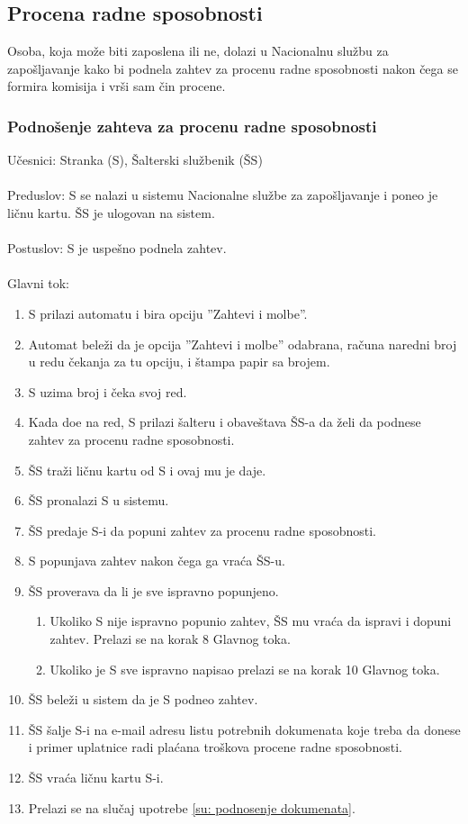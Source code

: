\subsection{Procena radne sposobnosti}

Osoba, koja mo\v ze biti zaposlena ili ne, dolazi u Nacionalnu slu\v zbu za zapo\v sljavanje kako bi podnela zahtev za procenu radne sposobnosti nakon \v cega se formira komisija i vr\v si sam \v cin procene.


\subsubsection{Podno\v senje zahteva za procenu radne sposobnosti}

\noindent U\v cesnici: Stranka (S), \v Salterski slu\v zbenik (\v SS)
\\
\\ Preduslov: S se nalazi u sistemu Nacionalne slu\v zbe za zapo\v sljavanje i poneo je li\v cnu kartu.  \v SS je ulogovan na sistem.
\\
\\ Postuslov: S je uspe\v sno podnela zahtev.
\\
\\ Glavni tok:
\begin{enumerate}
	\item S prilazi automatu i bira opciju ''Zahtevi i molbe''.
	\item Automat bele\v zi da je opcija ''Zahtevi i molbe'' odabrana, ra\v cuna naredni broj u redu \v cekanja za tu opciju, i \v stampa papir sa brojem.
	\item S uzima broj i \v ceka svoj red.
	\item Kada do\dj e na red, S prilazi \v salteru i obave\v stava \v SS-a da \v zeli da podnese zahtev za procenu radne sposobnosti.
	\item \v SS tra\v zi li\v cnu kartu od S i ovaj mu je daje.
	\item \v SS pronalazi S u sistemu.
	\item \v SS predaje S-i da popuni zahtev za procenu radne sposobnosti.
	\item S popunjava zahtev nakon \v cega ga vra\' ca \v SS-u.
	\item \v SS proverava da li je sve ispravno popunjeno.
	\begin{enumerate}
		\item Ukoliko S nije ispravno popunio zahtev, \v SS mu vra\' ca da ispravi i dopuni zahtev. Prelazi se na korak 8 Glavnog toka.
		\item Ukoliko je S sve ispravno napisao prelazi se na korak 10 Glavnog toka.
	\end{enumerate}
	
	\item \v SS bele\v zi u sistem da je S podneo zahtev.
	\item \v SS \v salje S-i na e-mail adresu listu potrebnih dokumenata koje treba da donese i primer uplatnice radi pla\' cana tro\v skova procene radne sposobnosti.
	\item \v SS vra\' ca li\v cnu kartu S-i.
	\item Prelazi se na slu\v caj upotrebe \ref{su: podnosenje dokumenata}.
\end{enumerate}
